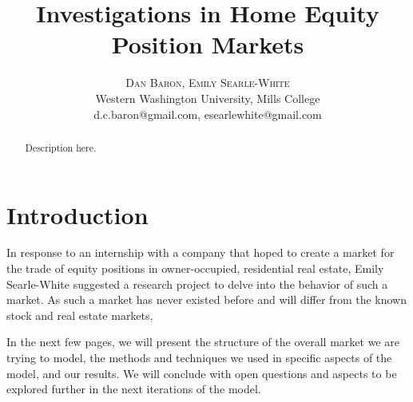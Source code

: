 \documentclass[twoside]{article}
\title{\vspace{-15mm}\fontsize{24pt}{10pt}\selectfont\textbf{Investigations in Home Equity Position Markets}} %
\author{
\large
\textsc{Dan Baron, Emily Searle-White}%
\\[2mm] %
\normalsize Western Washington University, Mills College \\ %
\normalsize {d.c.baron@gmail.com, esearlewhite@gmail.com} %
\vspace{-5mm}
}
\date{}
\begin{document}
\maketitle %

\thispagestyle{fancy} %


\begin{abstract}

\noindent Description here. %

\end{abstract}



\tableofcontents
\pagebreak

\section{Introduction}


In response to an internship with a company that hoped to create a market for the trade of equity positions in owner-occupied, residential real estate, Emily Searle-White suggested a research project to delve into the behavior of such a market. As such a market has never existed before and will differ from the known stock and real estate markets, 

In the next few pages, we will present the structure of the overall market we are trying to model, the methods and techniques we used in specific aspects of the model, and our results. We will conclude with open questions and aspects to be explored further in the next iterations of the model.
\end{document}
